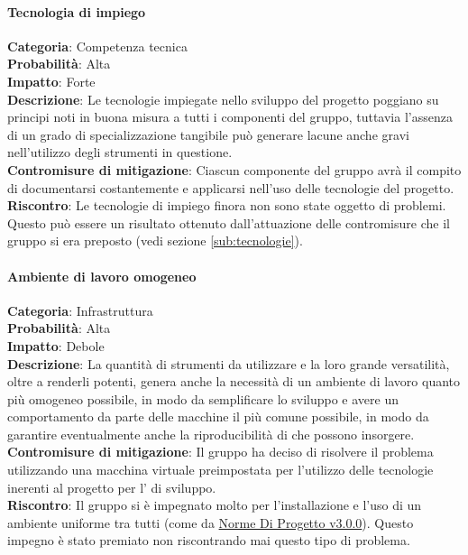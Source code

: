 \documentclass{scalatekids-article}
\begin{document}
\paragraph{Tecnologia di impiego}
\textbf{Categoria}: Competenza tecnica\\
\textbf{Probabilità}: Alta\\
\textbf{Impatto}: Forte\\
\textbf{Descrizione}: Le tecnologie impiegate nello sviluppo del progetto poggiano su principi noti in buona misura a tutti
i componenti del gruppo, tuttavia l'assenza di un grado di specializzazione tangibile può generare lacune anche gravi nell'utilizzo
degli strumenti in questione.\\
\textbf{Contromisure di mitigazione}: Ciascun componente del gruppo avrà il compito di documentarsi costantemente e applicarsi
nell'uso delle tecnologie del progetto.\\
\textbf{Riscontro}: Le tecnologie di impiego finora non sono state oggetto di problemi. Questo può essere un risultato ottenuto dall'attuazione delle contromisure che il gruppo si era preposto (vedi sezione \ref{sub:tecnologie}).\\
\paragraph{Ambiente di lavoro omogeneo}
\textbf{Categoria}: Infrastruttura\\
\textbf{Probabilità}: Alta\\
\textbf{Impatto}: Debole\\
\textbf{Descrizione}: La quantità di strumenti da utilizzare e la loro grande versatilità, oltre a renderli potenti, genera anche
la necessità di un ambiente di lavoro quanto più omogeneo possibile, in modo da semplificare lo sviluppo e avere un comportamento
da parte delle macchine il più comune possibile, in modo da garantire eventualmente anche la riproducibilità di  che possono
insorgere.\\
\textbf{Contromisure di mitigazione}: Il gruppo ha deciso di risolvere il problema utilizzando una macchina virtuale
preimpostata per l'utilizzo delle tecnologie inerenti al progetto per l' di sviluppo.\\
\textbf{Riscontro}: Il gruppo si è impegnato molto per l'installazione e l'uso di un ambiente uniforme tra tutti (come da \href{run:../Interni/NormeDiProgetto\_v3.0.0.pdf}{Norme Di Progetto v3.0.0}). Questo impegno è stato premiato non riscontrando mai questo tipo di problema.\\
\end{document}
